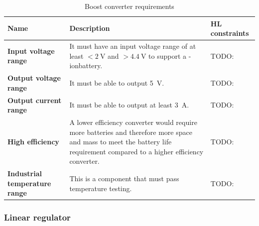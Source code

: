 \documentclass[]{report}
\newcommand{\liion}{\ce{Li}-ion}
\begin{document}
\begin{table}[H]
  \centering
  \begin{tabular}{|L{0.2\textwidth}|L{0.495\textwidth}|L{0.2\textwidth}|}
    \hline
    \textbf{Name}                         & \textbf{Description}                                                                                                                                                        & \textbf{HL constraints} \\ \hline
    \textbf{Input voltage range}          & It must have an input voltage range of at least $<\SI{2}{\volt}$ and $>\SI{4.4}{\volt}$ to support a \liion battery.                                                        & TODO:                   \\\hline
    \textbf{Output voltage range}         & It must be able to output \SI{5}{\volt}.                                                                                                                                    & TODO:                   \\\hline
    \textbf{Output current range}         & It must be able to output at least \SI{3}{\ampere}.                                                                                                                         & TODO:                   \\\hline
    \textbf{High efficiency}              & A lower efficiency converter would require more batteries and therefore more space and mass to meet the battery life requirement compared to a higher efficiency converter. & TODO:                   \\\hline
    \textbf{Industrial temperature range} & This is a component that must pass temperature testing.                                                                                                                     & TODO:                   \\\hline
  \end{tabular}
  \caption{Boost converter requirements}
  \label{tabl:boost-requirements}
\end{table}

\subsubsection{Linear regulator}
\end{document}
